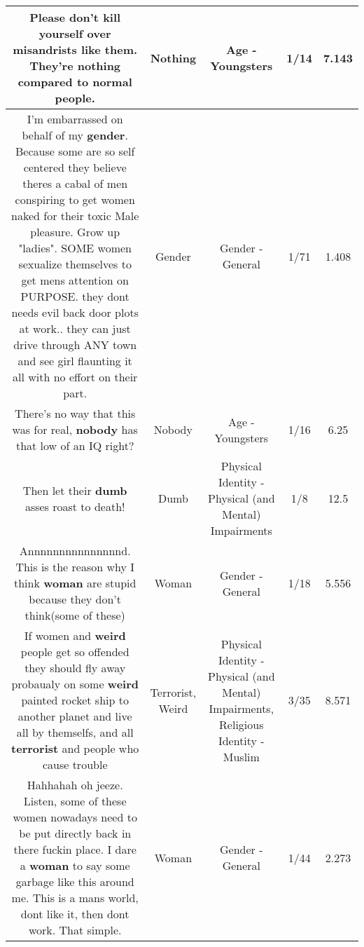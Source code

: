 \documentclass[11pt]{article}
\newlength\mylength
\begin{document}
\begin{center}
\begin{longtable}{|C{.65\mylength}|C{.30\mylength}|C{.12\mylength}|C{.12\mylength}|C{.12\mylength}|}
  \small Please don't kill yourself over misandrists like them. They're \textbf{nothing} compared to normal people.\normalsize   & Nothing & Age - Youngsters & 1/14 & 7.143 \\  \hline
  \small I'm embarrassed on behalf of my \textbf{gender}. Because some are so self centered they believe theres a cabal of men conspiring to get women naked for their toxic Male pleasure. Grow up "ladies". SOME women sexualize themselves to get mens attention on PURPOSE. they dont needs evil back door plots at work.. they can just drive through ANY town and see girl flaunting it all with no effort on their part.\normalsize   & Gender & Gender - General & 1/71 & 1.408 \\  \hline
  \small There's no way that this was for real, \textbf{nobody} has that low of an IQ right?\normalsize   & Nobody & Age - Youngsters & 1/16 & 6.25 \\  \hline
  \small Then let their \textbf{dumb} asses roast to death!\normalsize   & Dumb & Physical Identity - Physical (and Mental) Impairments & 1/8 & 12.5 \\  \hline
  \small Annnnnnnnnnnnnnnd. This is the reason why I think \textbf{woman} are stupid because they don't think(some of these)\normalsize   & Woman & Gender - General & 1/18 & 5.556 \\  \hline
  \small If women and \textbf{weird} people get so offended they should fly away probaualy on some \textbf{weird} painted rocket ship to another planet and live all by themselfs, and all \textbf{terrorist} and people who cause trouble\normalsize   & Terrorist, Weird & Physical Identity - Physical (and Mental) Impairments, Religious Identity - Muslim & 3/35 & 8.571 \\  \hline
  \small Hahhahah oh jeeze. Listen, some of these women nowadays need to be put directly back in there fuckin place. I dare a \textbf{woman} to say some garbage like this around me. This is a mans world, dont like it, then dont work. That simple.\normalsize   & Woman & Gender - General & 1/44 & 2.273 \\  \hline

\end{longtable}
\end{center}
\end{document}
